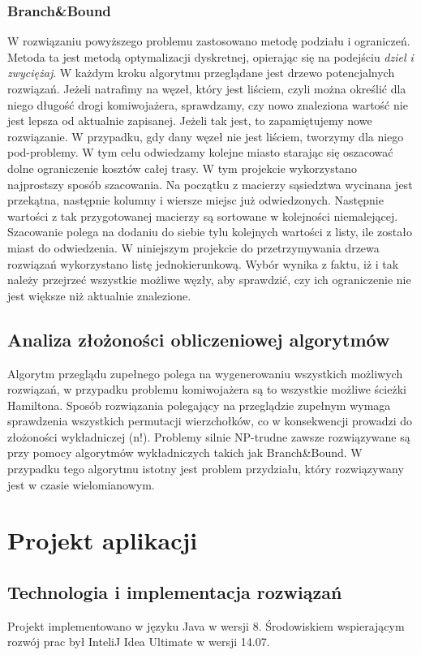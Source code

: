 \documentclass{article}
\begin{document}
		\subsubsection{Branch\&Bound}
			
				W rozwiązaniu powyższego problemu zastosowano metodę podziału i ograniczeń. Metoda ta jest metodą optymalizacji dyskretnej, opierając się na podejściu \textit{dziel i zwyciężaj}.
				W każdym kroku algorytmu przeglądane jest drzewo potencjalnych rozwiązań. Jeżeli natrafimy na węzeł, który jest liściem, czyli można określić dla niego długość drogi komiwojażera, sprawdzamy, czy nowo znaleziona wartość nie jest lepsza od aktualnie zapisanej. Jeżeli tak jest, to zapamiętujemy nowe rozwiązanie. W przypadku, gdy dany węzeł nie jest liściem, tworzymy dla niego pod-problemy. W tym celu odwiedzamy kolejne miasto starając się oszacować dolne ograniczenie kosztów całej trasy. W tym projekcie wykorzystano najprostszy sposób szacowania. Na początku z macierzy sąsiedztwa wycinana jest przekątna, następnie kolumny i wiersze miejsc już odwiedzonych. Następnie wartości z tak przygotowanej macierzy są sortowane w kolejności niemalejącej. Szacowanie polega na dodaniu do siebie tylu kolejnych wartości z listy, ile zostało miast do odwiedzenia. W niniejszym projekcie do przetrzymywania drzewa rozwiązań wykorzystano listę jednokierunkową. Wybór wynika z faktu, iż i tak należy przejrzeć wszystkie możliwe węzły, aby sprawdzić, czy ich ograniczenie nie jest większe niż aktualnie znalezione.
				
	\subsection{Analiza złożoności obliczeniowej algorytmów}
				Algorytm przeglądu zupełnego polega na wygenerowaniu wszystkich możliwych rozwiązań, w przypadku problemu komiwojażera są to wszystkie możliwe ścieżki Hamiltona. Sposób rozwiązania polegający na przeglądzie zupełnym wymaga sprawdzenia wszystkich permutacji wierzchołków, co w konsekwencji prowadzi do złożoności wykładniczej (n!). Problemy silnie NP-trudne zawsze rozwiązywane są przy pomocy algorytmów wykładniczych takich jak Branch\&Bound. W przypadku tego algorytmu istotny jest problem przydziału, który rozwiązywany jest w czasie wielomianowym.
\newpage
\section{Projekt aplikacji}	
	\subsection{Technologia i implementacja rozwiązań}	
	Projekt implementowano 	w języku Java w wersji 8. Środowiskiem wspierającym rozwój prac był InteliJ Idea Ultimate w wersji 14.07.   	
\end{document}
